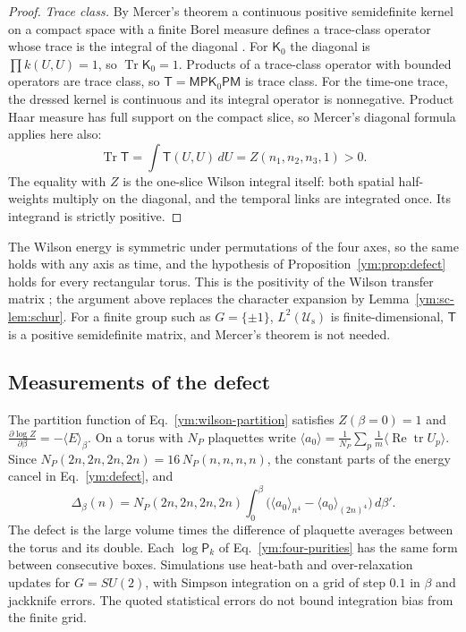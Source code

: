 \begin{proof}
\emph{Trace class.} By Mercer's theorem a continuous positive semidefinite
kernel on a compact space with a finite Borel measure defines a trace-class
operator whose trace is the integral of the diagonal \cite{Mercer1909}. For
$\mathsf K_0$ the diagonal is $\prod k(U,U)=1$, so
$\operatorname{Tr}\mathsf K_0=1$. Products of a trace-class operator with
bounded operators are trace class, so $\mathsf T=\mathsf M\mathsf P\mathsf
K_0\mathsf P\mathsf M$ is trace class. For the time-one trace, the dressed
kernel is continuous and its integral operator is nonnegative. Product Haar
measure has full support on the compact slice, so Mercer's diagonal
formula applies here also:
\begin{equation}\label{ym:sc-trace-one}
 \operatorname{Tr}\mathsf T=\int \mathsf T(U,U)\,dU
 = Z(n_1,n_2,n_3,1)>0 .
\end{equation}
The equality with $Z$ is the one-slice Wilson integral itself: both spatial
half-weights multiply on the diagonal, and the temporal links are integrated
once. Its integrand is strictly positive.
\end{proof}
The Wilson energy is symmetric under permutations of the four axes, so the
same holds with any axis as time, and the hypothesis of
Proposition~\ref{ym:prop:defect} holds for every rectangular torus. This is
the positivity of the Wilson transfer matrix \cite{Luscher1977,
OsterwalderSeiler1978}; the argument above replaces the character expansion
by Lemma~\ref{ym:sc-lem:schur}. For a finite group such as
$G=\{\pm1\}$, $L^2(\mathcal U_{\mathrm s})$ is finite-dimensional, $\mathsf T$
is a positive semidefinite matrix, and Mercer's theorem is not needed.

\subsection{Measurements of the defect}\label{ym:num-defect}
The partition function of Eq.~\eqref{ym:wilson-partition} satisfies
$Z(\beta=0)=1$ and
$\frac{\partial\log Z}{\partial\beta}=-\langle E\rangle_\beta$. On a torus with
$N_P$ plaquettes write
$\langle a_0\rangle=\frac{1}{N_P}\sum_p\frac1m\langle\operatorname{Re}
\operatorname{tr}U_p\rangle$. Since $N_P(2n,2n,2n,2n)=16\,N_P(n,n,n,n)$, the
constant parts of the energy cancel in Eq.~\eqref{ym:defect}, and
\begin{equation}\label{ym:num-integration}
 \Delta_\beta(n)=N_P(2n,2n,2n,2n)\int_0^\beta\Big(\langle a_0\rangle_{n^4}
 -\langle a_0\rangle_{(2n)^4}\Big)\,d\beta'.
\end{equation}
The defect is the large volume times the difference of plaquette averages
between the torus and its double. Each $\log\mathsf P_k$ of
Eq.~\eqref{ym:four-purities} has the same form between consecutive boxes.
Simulations use heat-bath and over-relaxation updates for $G=SU(2)$, with
Simpson integration on a grid of step $0.1$ in $\beta$ and jackknife errors.
The quoted statistical errors do not bound integration bias from the finite grid.

